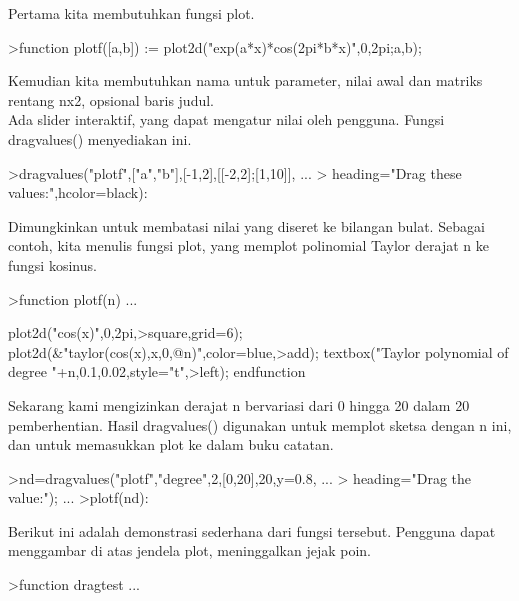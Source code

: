 \documentclass[a4paper,10pt]{article}
\begin{document}
\begin{eulernotebook}
\begin{eulercomment}
\begin{eulercomment}
\begin{eulercomment}
\begin{eulercomment}
\begin{eulercomment}
\begin{eulercomment}
\begin{eulercomment}
\begin{eulercomment}
\begin{eulercomment}
Pertama kita membutuhkan fungsi plot.
\end{eulercomment}
\begin{eulerprompt}
>function plotf([a,b]) := plot2d("exp(a*x)*cos(2pi*b*x)",0,2pi;a,b);
\end{eulerprompt}
\begin{eulercomment}
Kemudian kita membutuhkan nama untuk parameter, nilai awal dan matriks
rentang nx2, opsional baris judul.\\
Ada slider interaktif, yang dapat mengatur nilai oleh pengguna. Fungsi
dragvalues() menyediakan ini.
\end{eulercomment}
\begin{eulerprompt}
>dragvalues("plotf",["a","b"],[-1,2],[[-2,2];[1,10]], ...
>  heading="Drag these values:",hcolor=black):
\end{eulerprompt}
\begin{eulercomment}
Dimungkinkan untuk membatasi nilai yang diseret ke bilangan bulat.
Sebagai contoh, kita menulis fungsi plot, yang memplot polinomial
Taylor derajat n ke fungsi kosinus.
\end{eulercomment}
\begin{eulerprompt}
>function plotf(n) ...
\end{eulerprompt}
\begin{eulerudf}
  plot2d("cos(x)",0,2pi,>square,grid=6);
  plot2d(&"taylor(cos(x),x,0,@n)",color=blue,>add);
  textbox("Taylor polynomial of degree "+n,0.1,0.02,style="t",>left);
  endfunction
\end{eulerudf}
\begin{eulercomment}
Sekarang kami mengizinkan derajat n bervariasi dari 0 hingga 20 dalam
20 pemberhentian. Hasil dragvalues() digunakan untuk memplot sketsa
dengan n ini, dan untuk memasukkan plot ke dalam buku catatan.
\end{eulercomment}
\begin{eulerprompt}
>nd=dragvalues("plotf","degree",2,[0,20],20,y=0.8, ...
>   heading="Drag the value:"); ...
>plotf(nd):
\end{eulerprompt}
\begin{eulercomment}
Berikut ini adalah demonstrasi sederhana dari fungsi tersebut.
Pengguna dapat menggambar di atas jendela plot, meninggalkan jejak
poin.
\end{eulercomment}
\begin{eulerprompt}
>function dragtest ...
\end{eulerprompt}

\end{eulercomment}
\end{eulercomment}
\end{eulercomment}
\end{eulercomment}
\end{eulercomment}
\end{eulercomment}
\end{eulercomment}
\end{eulercomment}
\end{eulernotebook}
\end{document}
